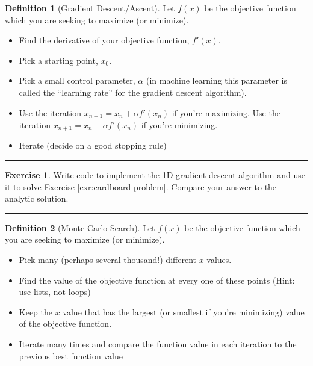 \documentclass[
]{book}
\theoremstyle{definition}
\newtheorem{definition}{Definition}[chapter]
\theoremstyle{definition}
\theoremstyle{definition}
\newtheorem{exercise}{Exercise}[chapter]
\theoremstyle{remark}
\begin{document}
\begin{definition}[Gradient Descent/Ascent]
\protect\hypertarget{def:unnamed-chunk-194}{}{\label{def:unnamed-chunk-194} {} }Let \(f(x)\) be the objective function which you are seeking to maximize (or minimize).

\begin{itemize}
\item
  Find the derivative of your objective function, \(f'(x)\).
\item
  Pick a starting point, \(x_0\).
\item
  Pick a small control parameter, \(\alpha\) (in machine learning this
  parameter is called the ``learning rate'' for the gradient descent
  algorithm).
\item
  Use the iteration \(x_{n+1} = x_n + \alpha f'(x_n)\) if you're
  maximizing. Use the iteration \(x_{n+1} = x_n - \alpha f'(x_n)\) if
  you're minimizing.
\item
  Iterate (decide on a good stopping rule)
\end{itemize}
\end{definition}

\begin{center}\rule{0.5\linewidth}{0.5pt}\end{center}

\begin{exercise}
\protect\hypertarget{exr:unnamed-chunk-195}{}{\label{exr:unnamed-chunk-195} }Write code to implement the 1D gradient descent algorithm and use it to solve Exercise \ref{exr:cardboard-problem}. Compare your answer to the analytic solution.
\end{exercise}

\begin{center}\rule{0.5\linewidth}{0.5pt}\end{center}

\begin{definition}[Monte-Carlo Search]
\protect\hypertarget{def:unnamed-chunk-196}{}{\label{def:unnamed-chunk-196} {} }Let \(f(x)\) be the objective function which you are seeking to maximize
(or minimize).

\begin{itemize}
\item
  Pick many (perhaps several thousand!) different \(x\) values.
\item
  Find the value of the objective function at every one of these
  points (Hint: use lists, not loops)
\item
  Keep the \(x\) value that has the largest (or smallest if you're
  minimizing) value of the objective function.
\item
  Iterate many times and compare the function value in each iteration
  to the previous best function value
\end{itemize}
\end{definition}
\end{document}
